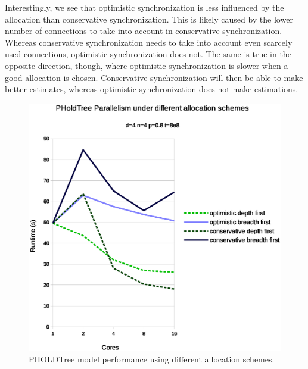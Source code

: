 Interestingly, we see that optimistic synchronization is less influenced by the allocation than conservative synchronization.
This is likely caused by the lower number of connections to take into account in conservative synchronization.
Whereas conservative synchronization needs to take into account even scarcely used connections, optimistic synchronization does not.
The same is true in the opposite direction, though, where optimistic synchronization is slower when a good allocation is chosen.
Conservative synchronization will then be able to make better estimates, whereas optimistic synchronization does not make estimations. 

\begin{figure}
    \center
    \includegraphics[width=\columnwidth]{fig/pholdtreeallochighp.eps}
    \caption{PHOLDTree model performance using different allocation schemes.}
    \label{fig:PholdTree_plot_alloc_high}
\end{figure}
